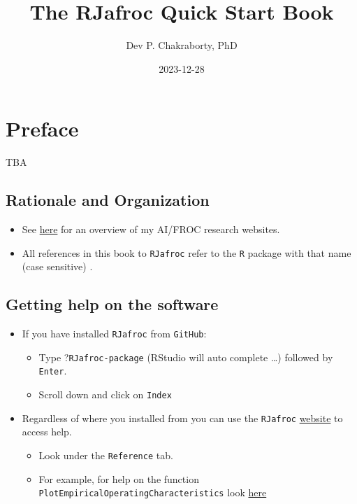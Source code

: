 \documentclass[
]{book}
\title{The RJafroc Quick Start Book}
\author{Dev P. Chakraborty, PhD}
\date{2023-12-28}
\providecommand{\tightlist}{%
  \setlength{\itemsep}{0pt}\setlength{\parskip}{0pt}}
\begin{document}
\maketitle

{
\setcounter{tocdepth}{1}
\tableofcontents
}
\hypertarget{quick-start-index-preface}{%
\chapter{Preface}\label{quick-start-index-preface}}

TBA

\hypertarget{quick-start-index-rationale-and-organization}{%
\section{Rationale and Organization}\label{quick-start-index-rationale-and-organization}}

\begin{itemize}
\tightlist
\item
  See \href{https://dpc10ster.github.io/ai-froc-research/}{here} for an overview of my AI/FROC research websites.
\item
  All references in this book to \texttt{RJafroc} refer to the \texttt{R} package with that name (case sensitive) \citep{R-RJafroc}.
\end{itemize}

\hypertarget{quick-start-index-getting-help}{%
\section{Getting help on the software}\label{quick-start-index-getting-help}}

\begin{itemize}
\tightlist
\item
  If you have installed \texttt{RJafroc} from \texttt{GitHub}:

  \begin{itemize}
  \tightlist
  \item
    Type ?\texttt{RJafroc-package} (RStudio will auto complete \ldots) followed by \texttt{Enter}.
  \item
    Scroll down and click on \texttt{Index}
  \end{itemize}
\item
  Regardless of where you installed from you can use the \texttt{RJafroc} \href{https://dpc10ster.github.io/RJafroc/}{website} to access help.

  \begin{itemize}
  \tightlist
  \item
    Look under the \texttt{Reference} tab.
  \item
    For example, for help on the function \texttt{PlotEmpiricalOperatingCharacteristics} look \href{https://dpc10ster.github.io/RJafroc/reference/PlotEmpiricalOperatingCharacteristics.html}{here}
  \end{itemize}
\end{itemize}
\end{document}
